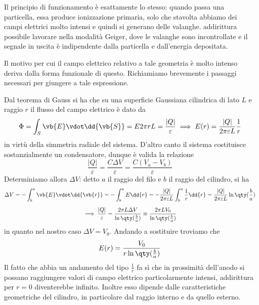 Il principio di funzionamento è esattamente lo stesso: quando passa una particella, essa produce ionizzazione primaria, solo che stavolta abbiamo dei campi elettrici molto intensi e quindi si generano delle valanghe. \E addirittura possibile lavorare nella modalità Geiger, dove le valanghe sono incontrollate e il segnale in uscita è indipendente dalla particella e dall'energia depositata.

\begin{esempio}
   Il motivo per cui il campo elettrico relativo a tale geometria è molto intenso deriva dalla forma funzionale di questo. Richiamiamo brevemente i passaggi necessari per giungere a tale espressione.

   Dal teorema di Gauss si ha che su una superficie Gaussiana cilindrica di lato $L$ e raggio $r$ il flusso del campo elettrico è dato da
   \begin{equation*}
      \Phi
      =\int_{S} \vb{E} \vdot \dd{\vb{S}}
      =E2\pi r L
      =\frac{|Q|}{\varepsilon}
      \implies
      E(r)=\frac{|Q|}{2\pi\varepsilon L} \frac{1}{r}
   \end{equation*}
   in virtù della simmetria radiale del sistema. D'altro canto il sistema costituisce sostanzialmente un condensatore, dunque è valida la relazione
   \begin{equation*}
      \frac{|Q|}{\varepsilon}
      =\frac{C \Delta V}{\varepsilon}
      =\frac{C (V_a - V_b)}{\varepsilon}
   \end{equation*}
   Determiniamo allora $\Delta V$: detto $a$ il raggio del filo e $b$ il raggio del cilindro, si ha
   \begin{gather*}
      \Delta V
      =-\int_{b}^{a} \vb{E} \vdot \dd{\vb{r}}
      =-\int_{b}^{a} E \dd{r}
      =-\frac{|Q|}{2\pi\varepsilon L} \int_{b}^{a} \frac{1}{r} \dd{r}
      =\frac{|Q|}{2\pi\varepsilon L} \ln\qty(\frac{b}{a})
      \\[0.2cm]
      \implies
      \frac{|Q|}{\varepsilon}
      =\frac{2\pi L \Delta V}{\ln\qty(\frac{b}{a})}
      \equiv \frac{2\pi L V_0}{\ln\qty(\frac{b}{a})}
   \end{gather*}
   in quanto nel nostro caso $\Delta V=V_0$. Andando a sostituire troviamo che
   \begin{equation*}
      E(r)=\frac{V_0}{r \ln\qty(\frac{b}{a})}
   \end{equation*}
   Il fatto che abbia un andamento del tipo $\frac{1}{r}$ fa sì che in prossimità dell'anodo si possano raggiungere valori di campo elettrico particolarmente intensi, addirittura per $r=0$ diventerebbe infinito. Inoltre esso dipende dalle caratteristiche geometriche del cilindro, in particolare dal raggio interno e da quello esterno.\\

\end{esempio}

